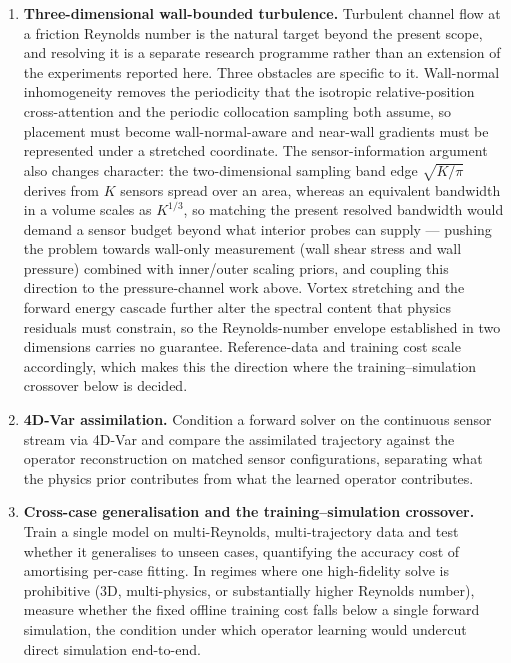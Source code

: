 \begin{enumerate}
    The third keeps $p$ as an output but adds the pressure-Poisson residual as a second Augmented-Lagrangian constraint alongside continuity, a softer intervention that reuses the existing multiplier machinery (\S\ref{sec:multi_al_negative}) and can be compared against the mixed evidence already reported for multi-constraint AL. Whichever route is taken, the evaluation should report the pressure-gradient and gauge-removed errors of Appendix~\ref{app:pressure_limit} against the same DNS reference, so that progress is measured on the metric on which the present scope limit was established.
    \item \textbf{Three-dimensional wall-bounded turbulence.} Turbulent channel flow at a friction Reynolds number is the natural target beyond the present scope, and resolving it is a separate research programme rather than an extension of the experiments reported here. Three obstacles are specific to it. Wall-normal inhomogeneity removes the periodicity that the isotropic relative-position cross-attention and the periodic collocation sampling both assume, so placement must become wall-normal-aware and near-wall gradients must be represented under a stretched coordinate. The sensor-information argument also changes character: the two-dimensional sampling band edge $\sqrt{K/\pi}$ derives from $K$ sensors spread over an area, whereas an equivalent bandwidth in a volume scales as $K^{1/3}$, so matching the present resolved bandwidth would demand a sensor budget beyond what interior probes can supply --- pushing the problem towards wall-only measurement (wall shear stress and wall pressure) combined with inner/outer scaling priors, and coupling this direction to the pressure-channel work above. Vortex stretching and the forward energy cascade further alter the spectral content that physics residuals must constrain, so the Reynolds-number envelope established in two dimensions carries no guarantee. Reference-data and training cost scale accordingly, which makes this the direction where the training--simulation crossover below is decided.
    \item \textbf{4D-Var assimilation.} Condition a forward solver on the continuous sensor stream via 4D-Var and compare the assimilated trajectory against the operator reconstruction on matched sensor configurations, separating what the physics prior contributes from what the learned operator contributes.
    \item \textbf{Cross-case generalisation and the training--simulation crossover.} Train a single model on multi-Reynolds, multi-trajectory data and test whether it generalises to unseen cases, quantifying the accuracy cost of amortising per-case fitting. In regimes where one high-fidelity solve is prohibitive (3D, multi-physics, or substantially higher Reynolds number), measure whether the fixed offline training cost falls below a single forward simulation, the condition under which operator learning would undercut direct simulation end-to-end.
\end{enumerate}
